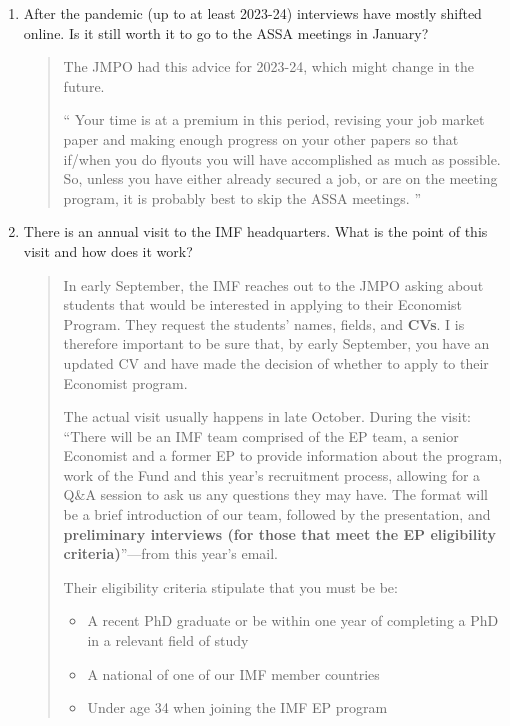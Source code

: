 \documentclass{\classes/econtex}
\begin{document}
\begin{enumerate}
\item After the pandemic (up to at least 2023-24) interviews have mostly shifted online. Is it still worth it to go to the ASSA meetings in January?

\begin{quote}
	The JMPO had this advice for 2023-24, which might change in the future.
	
	``
	Your time is at a premium in this period, revising your job market paper and making enough progress on your other papers so that if/when you do flyouts you will have accomplished as much as possible.  So, unless you have either already secured a job, or are on the meeting program, it is probably best to skip the ASSA meetings.
	''
\end{quote}

\item There is an annual visit to the IMF headquarters. What is the point of this visit and how does it work?

\begin{quote}
	
	In early September, the IMF reaches out to the JMPO asking about students that would be interested in applying to their Economist Program. They request the students' names, fields, and \textbf{CVs}. I is therefore important to be sure that, by early September, you have an updated CV and have made the decision of whether to apply to their Economist program.
	
	The actual visit usually happens in late October. During the visit:
	``There will be an IMF team comprised of the EP team, a senior Economist and a former EP to provide information about the program, work of the Fund and this year's recruitment process, allowing for a Q\&A session to ask us any questions they may have. The format will be a brief introduction of our team, followed by the presentation, and \textbf{preliminary interviews (for those that meet the EP eligibility criteria)}''---from this year's email.
	
	Their eligibility criteria stipulate that you must be be:
	\begin{itemize}
		\item A recent PhD graduate or be within one year of completing a PhD in a relevant field of study
		\item A national of one of our IMF member countries
		\item Under age 34 when joining the IMF EP program
	\end{itemize}
	
\end{quote}

\end{enumerate}
\end{document}
